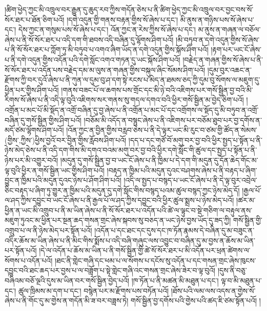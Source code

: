 །ཚིག་ཕྱེད་ཀྱང་མི་འཁྲུལ་བར་རྒྱུན་དུ་ཆུད་རབ་ཀྱིས་གདོན་ཅེས་པ་ནི་ཚིག་ཕྱེད་ཀྱང་མི་འཁྲུལ་བར་བྱང་བས་སོ་སོར་ཐར་པ་ཐོན་ཅིག་པའོ། །དགེ་འདུན་གྱི་གནས་བརྟན་གྱིས་སོ་ཞེས་པ་དང་། མི་ནུས་ན་གཉིས་པས་སོ་ཞེས་པ་དང་། དེས་ཀྱང་ན་གསུམ་པས་སོ་ཞེས་པ་དང་། འོན་ཀྱང་ན་རེས་ཀྱིས་སོ་ཞེས་པ་དང་། མ་ནུས་ན་གཞན་ལ་བཅོལ་ཞེས་པ་ནི་སོ་སོར་ཐར་པ་འདི་དག་གི་ཐབས་འདི་བཞིན་དུ་ལྷོགས་ཤིག་པའོ། །མི་བཏུབ་ན་དགེ་འདུན་གྱིས་སོ་ཞེས་པ་ནི་སོ་སོར་ཐར་པ་ཀློག་ཏུ་མི་བཏུབ་པ་འགའ་ཞིག་ཡོད་ན་དགེ་འདུན་གྱིས་སྐོས་ཤིག་པའོ། །རྟག་པར་ཡང་ངོ་ཞེས་པ་ནི་དགེ་འདུན་གྱིས་འདོན་པའི་དགེ་སློང་འགའ་གཏན་དུ་ཡང་སྐོས་ཤིག་པའོ། །བརྗེད་ན་གཞན་གྱིས་སོ་ཞེས་པ་ནི་སོ་སོར་ཐར་པ་འདོན་པས་བརྗེད་དམ་མ་ལུས་ན་གཞན་གྱིས་བསྐུལ་ཞིང་སོམས་ཤིག་པའོ། །དུམ་བུར་འཆང་ན་རྫོགས་ཀྱི་བར་དུའོ་ཞེས་པ་ནི་ཀུན་ལ་དུམ་བུ་ཤ་དག་སྟེ་རངས་པ་མེད་ན་ཐམས་ཅད་ཀྱི་དུམ་བུ་སོགས་ལ་མཇུག་དུ་ཕྱིན་པར་གྱིས་ཤིག་པའོ། །གནས་བཟང་པོ་ལ་ཆགས་པས་གྲོང་དང་མི་ཉེ་བའི་འཇིགས་པར་གསོ་སྦྱིན་བྱ་བའི་མི་རིགས་སོ་ཞེས་པ་ནི་འདི་ལྟ་བུའི་འཇིགས་སར་གནས་སུ་གདལ་དགའ་བའི་ཕྱིར་གསོ་སྦྱིན་མ་བྱེད་ཅིག་པའོ། །འགྲོན་པ་མང་པོ་མི་སྡོད་ན་འགྲོ་བཞིན་དུ་བྱ་ཞེས་པ་ནི་འགྲོན་པ་མང་པོ་དང་འགྲོགས་ལ་སྡོད་དུ་མི་བཏུབ་ན་འགྲོ་བཞིན་དུ་གསོ་སྦྱིན་གྱིས་ཤིག་པའོ། །བཅོམ་མི་འདོད་ན་བསྙུང་ཞེས་པ་ནི་འཇིགས་པར་བཅོམ་ཐུབ་པར་བྱ་དགོས་ན་མདོ་ཙམ་ལྷོགས་ཤིག་པའོ། །འོན་ཀྱང་ན་བྱིན་གྱིས་བརླབ་ཅེས་པ་ནི་དེ་ལྟར་ཡང་མི་རུང་བ་ཙམ་གྱི་ཚོད་ན་སེམས་(གྱིས་‚ཀྱིས་)ཕྱིས་བྱའོ་བར་བྱིན་གྱིས་རློབས་ཤིག་པའོ། །དད་པ་དང་གཙོ་བོ་མགུ་བར་བྱ་བའི་ཕྱིར་སྤྱད་པ་སྟོན་པ་ནི་ཉེས་མེད་ཅེས་པ་ནི་འདི་དག་གིས་མི་དགའ་བའམ་མགུ་བར་བྱ་བའི་ཕྱིར་དགེ་སློང་གི་ཚུལ་དང་སྤྱད་པ་སྟོན་པ་ནི་ཉེས་པར་མི་འགྱུར་བའོ། །མདུན་དུ་གསོ་སྦྱིན་བྱ་བ་ཡང་ངོ་ཞེས་པ་ནི་ཁྱིམ་པ་དེ་དག་གི་མདུན་དུ་དོན་ཆེད་གོང་མ་ལྟ་བུའི་ཕྱིར་ན་གསོ་སྦྱིན་ཡང་གྱིས་ཤིག་པའོ། །བརྟད་ན་ཁྱིམ་པའི་མདུན་དུའང་བཤགས་ཞེས་པ་ནི་བརྟད་པ་ཞིག་བྱུང་ན་ཁྱིམ་པའི་མདུན་དུའང་ཉེས་པ་ཤོག་ཤིག་པའོ། །འདི་ལ་སྤྱད་པ་བསྙད་པ་ཡང་ངོ་ཞེས་པ་ནི་དེ་ལྟ་བུར་འབྲེལ་ཅིང་བརྟད་པ་ཞིག་ཏུ་གྱུར་ན་ཁྱིམ་པའི་མདུན་དུ་དགེ་སློང་གིས་བསྙད་པའམ་ཚུལ་བསྙད་ཀྱང་ཉེས་མེད་དོ། །རྒྱལ་པོ་ལ་ཤད་ཀྱིས་དབྱུང་བ་ཡང་ངོ་ཞེས་པ་ནི་རྒྱལ་པོ་ལ་ཤད་ཀྱིས་དབྱུང་བའི་ཕྱིར་ཚུལ་སྨྲས་པ་ཉེས་མེད་པའོ། །ཚར་མ་ཕྱིན་ན་ཡང་མི་འགྲུབ་པ་ནི་མ་ཡིན་ཞེས་པ་ནི་སོ་སོར་ཐར་པ་འདོན་པའི་ཚེ་ལ་ལྟུང་བ་སྡེ་གཅིག་ལ་བརྟུལ་ནས་མཇུག་ཏུའང་མ་ཕྱིན་པར་སྔན་ཆད་གསན་གྲང་ཞེས་སྐབས་སུ་བཅད་ན་ཡང་ཉེས་བྱས་ཡོད་དུ་ཟད་ཀྱི། གསོ་སྦྱིན་གྱི་འགྲུབ་པ་ལ་ནི་ཉེས་མེད་པར་སྟོན་པའོ། །འདོན་པ་དང་ཐང་དང་དུས་དང་ཁ་ཏོན་རྣམས་དེ་བཞིན་དུ་མ་བཟུང་ན་འདིར་ཆོས་མ་ཡིན་ཞེས་པ་ནི་མིང་གིས་སྨོས་པ་འདི་བཞི་གཞུང་ལས་འབྱུང་བ་བཞིན་དུ་མ་བྱས་ན་ཆོས་མ་ཡིན་པར་སྟོན་པའོ། །དེ་ལ་འདོན་པ་ཆོས་མ་ཡིན་པ་ནི་གསོ་སྦྱིན་གྱི་ཚེ་སོ་སོར་ཐར་པ་མི་འདོན་པར་ཕྲན་ཚེགས་ལ་སོགས་པ་འདོན་པའོ། །ཐང་ནི་གླེང་གཞི་དང་ཕམ་པ་ལ་སོགས་པ་དངོས་སུ་འདོན་པ་དང་གསན་གྲང་ཞེས་ཁུངས་དབྱུང་བའི་ཐང་ཆད་པར་བྱས་པ་ལ་བཟློག་པ་སྟེ་གླེང་གཞི་འང་གསན་གྲང་ཞེས་ཟེར་བ་ལྟ་བུའོ། །དུས་ནི་བཅུ་བཞིའམ་བཅོ་ལྔའི་དུས་མ་ཡིན་བར་གསོ་སྦྱིན་བྱེད་པའོ། །ཁ་ཏོན་པ་ནི་མཚན་མི་མཐུན་པ་དང་། ལྟ་བ་མི་མཐུན་པ་དང་། ཚུལ་ཁྲིམས་མ་དག་པ་དང་། བསྙེན་པར་མ་རྫོགས་པས་བཏོན་པའོ། །ཐོས་པའི་ལམ་ལས་འདས་ན་གྱེས་སོ་ཞེས་པ་ནི་གོང་དུ་མ་གྱེས་ན་གདོན་མི་ཟ་བར་བཟླས་ཏེ། གསོ་སྦྱིན་བྱ་དགོས་པའི་གྱེས་པའི་ཚད་ཇི་ཙམ་སྟོན་པའོ། །
